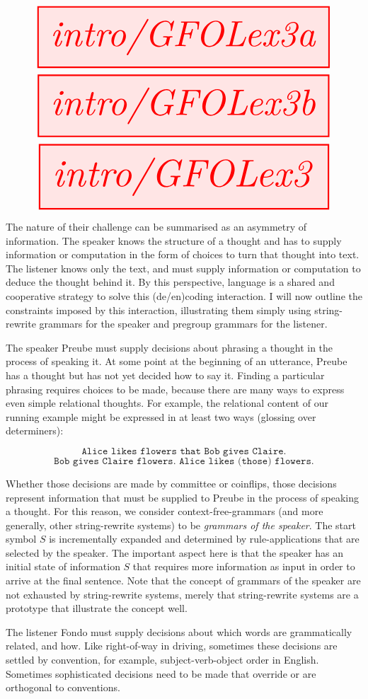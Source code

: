\begin{example}
\[\resizebox{\textwidth}{!}{\tikzfig{intro/GFOLex3a}}\]
\[\resizebox{\textwidth}{!}{\tikzfig{intro/GFOLex3b}}\]
\[\resizebox{\textwidth}{!}{\tikzfig{intro/GFOLex3}}\]
\end{example}

The nature of their challenge can be summarised as an asymmetry of information. The speaker knows the structure of a thought and has to supply information or computation in the form of choices to turn that thought into text. The listener knows only the text, and must supply information or computation to deduce the thought behind it. By this perspective, language is a shared and cooperative strategy to solve this (de/en)coding interaction. I will now outline the constraints imposed by this interaction, illustrating them simply using string-rewrite grammars for the speaker and pregroup grammars for the listener.

 The speaker Preube must supply decisions about phrasing a thought in the process of speaking it. At some point at the beginning of an utterance, Preube has a thought but has not yet decided how to say it. Finding a particular phrasing requires choices to be made, because there are many ways to express even simple relational thoughts. For example, the relational content of our running example might be expressed in at least two ways (glossing over determiners):

\[\texttt{Alice likes flowers that Bob gives Claire.}\]
\[\texttt{Bob gives Claire flowers. Alice likes (those) flowers.}\]

Whether those decisions are made by committee or coinflips, those decisions represent information that must be supplied to Preube in the process of speaking a thought. For this reason, we consider context-free-grammars (and more generally, other string-rewrite systems) to be \emph{grammars of the speaker}. The start symbol $S$ is incrementally expanded and determined by rule-applications that are selected by the speaker. The important aspect here is that the speaker has an initial state of information $S$ that requires more information as input in order to arrive at the final sentence. Note that the concept of grammars of the speaker are not exhausted by string-rewrite systems, merely that string-rewrite systems are a prototype that illustrate the concept well.

 The listener Fondo must supply decisions about which words are grammatically related, and how. Like right-of-way in driving, sometimes these decisions are settled by convention, for example, subject-verb-object order in English. Sometimes sophisticated decisions need to be made that override or are orthogonal to conventions.

